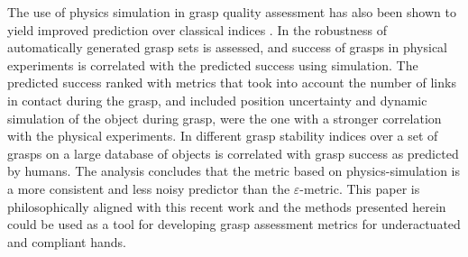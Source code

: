 The use of physics simulation in grasp quality assessment has also been shown to yield improved prediction over classical indices \cite{Kappler15,JunggonKim13}.  In \cite{JunggonKim13} the robustness of automatically generated grasp sets is assessed, and success of grasps in physical experiments is correlated with the predicted success using simulation. The predicted success ranked with metrics that took into account the number of links in contact during the grasp, and included position uncertainty and dynamic simulation of the object during grasp, were the one with a stronger correlation with the physical experiments.
In \cite{Kappler15} different grasp stability indices over a set of grasps on a large database of objects is correlated with grasp success as predicted by humans. The analysis concludes that the metric based on  physics-simulation is a more consistent and less noisy predictor than the $\varepsilon$-metric.
This paper is philosophically aligned with this recent work and the methods presented herein could be used as a tool for developing grasp assessment metrics for underactuated and compliant hands.






